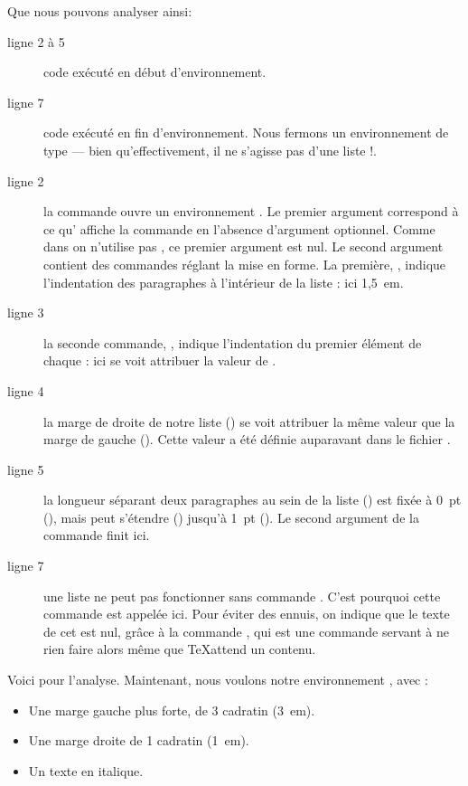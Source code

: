 Que nous pouvons analyser ainsi:
\begin{description}
\item[ligne 2 à 5] code exécuté en début d'environnement.
\item[ligne 7] code exécuté en fin d'environnement. Nous fermons un environnement de type  --- bien qu'effectivement, il ne s'agisse pas d'une liste !.
\item[ligne 2] la commande  ouvre un environnement . Le premier argument correspond à ce qu' affiche  la commande  en l'absence d'argument optionnel. Comme dans  on n'utilise pas , ce premier argument est nul. Le second argument contient des commandes réglant la mise en forme. La première, , indique l'indentation des paragraphes à l'intérieur de la liste : ici 1,5~em.
\item[ligne 3] la seconde commande, , indique l'indentation du premier élément de chaque : ici  se voit attribuer la valeur de .
\item[ligne 4] la marge de droite de notre liste () se voit attribuer la même valeur que la marge de gauche (). Cette valeur a été définie auparavant dans le fichier .
\item[ligne 5]la longueur séparant deux paragraphes au sein de la liste () est fixée à 0~pt (), mais peut s'étendre () jusqu'à 1~pt (). Le second argument de la commande  finit ici.
\item[ligne 7]une liste ne peut pas fonctionner sans commande . C'est pourquoi cette commande est appelée ici. Pour éviter des ennuis, on indique que le texte de cet  est nul, grâce à la commande , qui est une commande servant à ne rien faire alors même que \TeX attend un contenu.
\end{description}

Voici pour l'analyse. Maintenant, nous voulons notre environnement , avec :
\begin{itemize}
\item Une marge gauche plus forte, de 3 cadratin (3~em).
\item Une marge droite de 1 cadratin (1~em). 
\item Un texte en italique.
\end{itemize}

